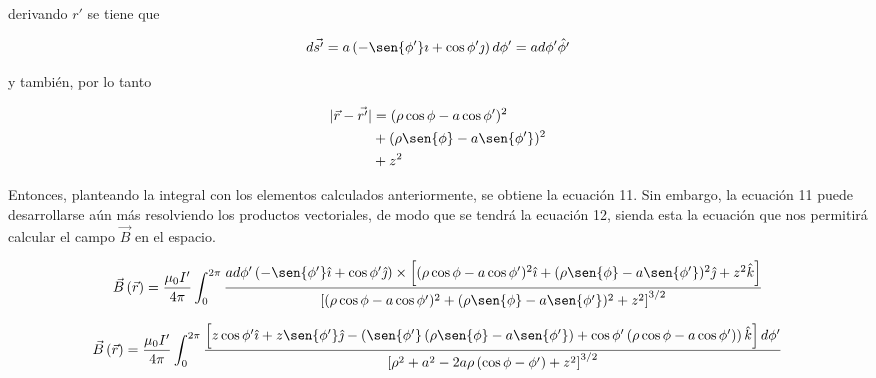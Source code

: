 \begin{multicols}{2}
derivando $r'$ se tiene que

\begin{equation}
    d\vec{s'} = a\left(-\sen{\phi'}\imath + \cos{\phi'}\jmath\right)d\phi' = ad\phi'\hat{\phi'}
\end{equation}

y también, por lo tanto

\begin{equation}
    \begin{split}
        |\vec{r} - \vec{r'}| &= (\rho\cos{\phi} - a\cos{\phi'})^2\\
        & + (\rho\sen{\phi} - a\sen{\phi'})^2\\
        & + z^2
    \end{split}
\end{equation}

Entonces, planteando la integral con los elementos calculados anteriormente, se obtiene la ecuación 11. Sin embargo, la ecuación 11 puede desarrollarse aún más resolviendo los productos vectoriales, de modo que se tendrá la ecuación 12, sienda esta la ecuación que nos permitirá calcular el campo $\vec{B}$ en el espacio.

\end{multicols}
\begin{multicols}{1}
    \begin{equation}
        \vec{B}\left(\vec{r}\right) = \frac{\mu_0 I'}{4\pi} \int_{0}^{2\pi} \frac{
            ad\phi'\left(-\sen{\phi'} \hat{\imath} + \cos{\phi'} \hat{\jmath}\right) 
            \times 
            \left[(\rho\cos{\phi} - a\cos{\phi'})^2 \hat{\imath} + (\rho\sen{\phi} - a\sen{\phi'})^2 \hat{\jmath} + z^2 \hat{k}\right]
        }{
            \left[(\rho\cos{\phi} - a\cos{\phi'})^2 + (\rho\sen{\phi} - a\sen{\phi'})^2 + z^2\right]^{3/2}
        }
    \end{equation}
\end{multicols}

\begin{multicols}{2}
    \begin{equation}
        \vec{B}\left(\vec{r}\right) = \frac{\mu_0 I'}{4\pi} \int_{0}^{2\pi} \frac{
            \left[z\cos{\phi'}\hat{\imath}
            + z\sen{\phi'}\hat{\jmath}
            - \left(
                \sen{\phi'}\left(\rho\sen{\phi} - a\sen{\phi'}\right)
                + \cos{\phi'}\left(\rho\cos{\phi} - a\cos{\phi'}\right)
            \right)\hat{k}\right]
            d\phi'
        }{
            \left[\rho^2 + a^2 - 2a\rho\left(\cos{\phi - \phi'}\right) + z^2\right]^{3/2}
        }
    \end{equation}
\end{multicols}

